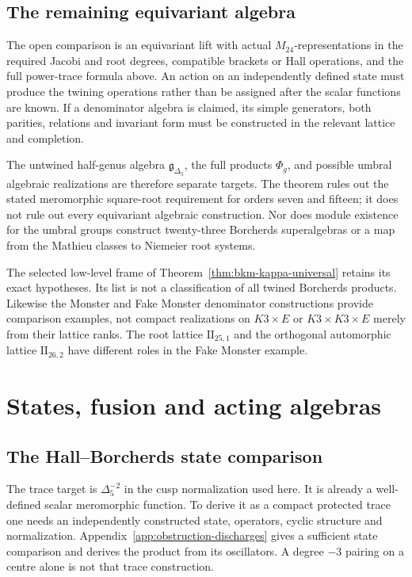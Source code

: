 \subsection{The remaining equivariant algebra}

The open comparison is an equivariant lift with actual
\(M_{24}\)-representations in the required Jacobi and root
degrees, compatible brackets or Hall operations, and the full
power-trace formula above. An action on an independently defined
state must produce the twining operations rather than be assigned
after the scalar functions are known. If a denominator algebra is
claimed, its simple generators, both parities, relations and
invariant form must be constructed in the relevant lattice and
completion.

The untwined half-genus algebra \(\mathfrak g_{\Delta_5}\),
the full products \(\Phi_g\), and possible umbral algebraic
realizations are therefore separate targets. The theorem rules
out the stated meromorphic square-root requirement for orders
seven and fifteen; it does not rule out every equivariant
algebraic construction. Nor does module existence for the umbral
groups construct twenty-three Borcherds superalgebras or a map
from the Mathieu classes to Niemeier root systems.

The selected low-level frame of
Theorem~\ref{thm:bkm-kappa-universal} retains its exact hypotheses.
Its list is not a classification of all twined Borcherds products.
Likewise the Monster and Fake Monster denominator constructions
provide comparison examples, not compact realizations on
\(K3\times E\) or \(K3\times K3\times E\) merely from their
lattice ranks. The root lattice \(\mathrm{II}_{25,1}\) and the
orthogonal automorphic lattice \(\mathrm{II}_{26,2}\) have
different roles in the Fake Monster example.

\section{States, fusion and acting algebras}
\label{subsec:subsequent-constructions}

\subsection{The Hall--Borcherds state comparison}
\label{subsubsec:open-hall-borcherds}

The trace target is \(\Delta_5^{-2}\) in the cusp normalization
used here. It is already a well-defined scalar meromorphic
function. To derive it as a compact protected trace one needs an
independently constructed state, operators, cyclic structure and
normalization. Appendix~\ref{app:obstruction-discharges} gives a
sufficient state comparison and derives the product from its
oscillators. A degree \(-3\) pairing on a centre alone is not
that trace construction.

